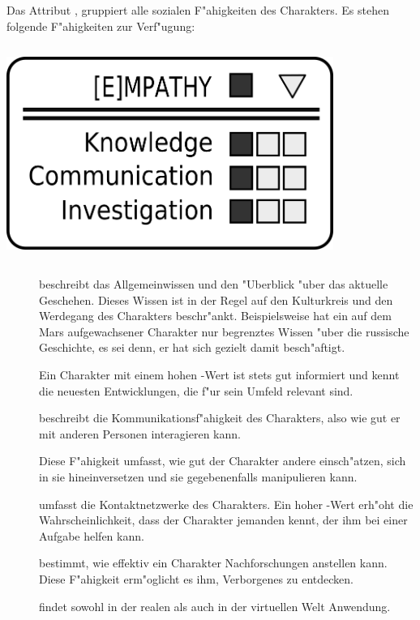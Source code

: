 \medskip
\begin{column}[l]{0.55}
    Das Attribut , gruppiert alle sozialen F"ahigkeiten des Charakters. Es stehen folgende F"ahigkeiten zur Verf"ugung:
\end{column}
\begin{column}[r]{0.45}
    \centering
    \includegraphics[width=0.80\textwidth]{images/character_empathy.png}
\end{column}

\begin{description}
    \item[]  beschreibt das Allgemeinwissen und den "Uberblick "uber das aktuelle Geschehen.
        Dieses Wissen ist in der Regel auf den Kulturkreis und den Werdegang des Charakters beschr"ankt. Beispielsweise hat ein auf dem Mars aufgewachsener Charakter nur begrenztes Wissen "uber die russische Geschichte, es sei denn, er hat sich gezielt damit besch"aftigt.

        Ein Charakter mit einem hohen -Wert ist stets gut informiert und kennt die neuesten Entwicklungen, die f"ur sein Umfeld relevant sind.
    \item[]  beschreibt die Kommunikationsf"ahigkeit des Charakters, also wie gut er mit anderen 
        Personen interagieren kann.

        Diese F"ahigkeit umfasst, wie gut der Charakter andere einsch"atzen, sich in sie hineinversetzen und sie gegebenenfalls manipulieren kann.

         umfasst die Kontaktnetzwerke des Charakters. Ein hoher -Wert erh"oht die Wahrscheinlichkeit, dass der Charakter jemanden kennt, der ihm bei einer Aufgabe helfen kann.
    \item[]  bestimmt, wie effektiv ein Charakter Nachforschungen anstellen kann. Diese F"ahigkeit 
        erm"oglicht es ihm, Verborgenes zu entdecken.

         findet sowohl in der realen als auch in der virtuellen Welt Anwendung.
\end{description}

